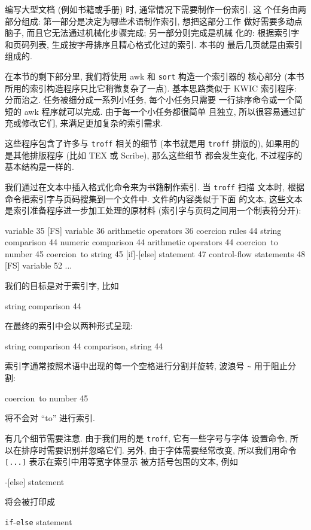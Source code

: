 编写大型文档 (例如书籍或手册) 时, 通常情况下需要制作一份索引. 这
个任务由两部分组成: 第一部分是决定为哪些术语制作索引, 想把这部分工作
做好需要多动点脑子, 而且它无法通过机械化步骤完成; 另一部分则完成是机械
化的: 根据索引字和页码列表, 生成按字母排序且精心格式化过的索引. 本书的
最后几页就是由索引组成的.

在本节的剩下部分里, 我们将使用 awk 和 \texttt{sort} 构造一个索引器的
核心部分 (本书所用的索引构造程序只比它稍微复杂了一点). 基本思路类似于
KWIC 索引程序: 分而治之. 任务被细分成一系列小任务, 每个小任务只需要
一行排序命令或一个简短的 awk 程序就可以完成. 由于每一个小任务都很简单
且独立, 所以很容易通过扩充或修改它们, 来满足更加复杂的索引需求.

这些程序包含了许多与 \texttt{troff} 相关的细节 (本书就是用 \texttt{troff}
排版的), 如果用的是其他排版程序 (比如 TEX 或 Scribe), 那么这些细节
都会发生变化, 不过程序的基本结构是一样的.

我们通过在文本中插入格式化命令来为书籍制作索引. 当 \texttt{troff} 扫描 
文本时, 根据命令把索引字与页码搜集到一个文件中. 文件的内容类似于下面
的文本, 这些文本是索引准备程序进一步加工处理的原材料
(索引字与页码之间用一个制表符分开):
%
\begin{awkcode}
    [FS] variable       35
    [FS] variable       36
    arithmetic operators        36
    coercion rules      44
    string comparison   44
    numeric comparison  44
    arithmetic operators        44
    coercion~to number  45
    coercion~to string  45
    [if]-[else] statement       47
    control-flow statements     48
    [FS] variable       52
    ...
\end{awkcode}
我们的目标是对于索引字, 比如 
\begin{awkcode}
    string comparison       44
\end{awkcode}
在最终的索引中会以两种形式呈现:
\begin{awkcode}
    string comparison 44
    comparison, string 44
\end{awkcode}
索引字通常按照术语中出现的每一个空格进行分割并旋转, 波浪号 \verb'~'
用于阻止分割:
\begin{awkcode}
    coercion~to number      45
\end{awkcode}
将不会对 ``to'' 进行索引.

有几个细节需要注意. 由于我们用的是 \texttt{troff}, 它有一些字号与字体
设置命令, 所以在排序时需要识别并忽略它们. 另外, 由于字体需要经常改变,
所以我们用命令 \texttt{[...]} 表示在索引中用等宽字体显示
被方括号包围的文本, 例如 
\begin{awkcode}
    [if]-[else] statement
\end{awkcode}
将会被打印成
\begin{pattern}
    \texttt{if}-\texttt{else} statement
\end{pattern}

